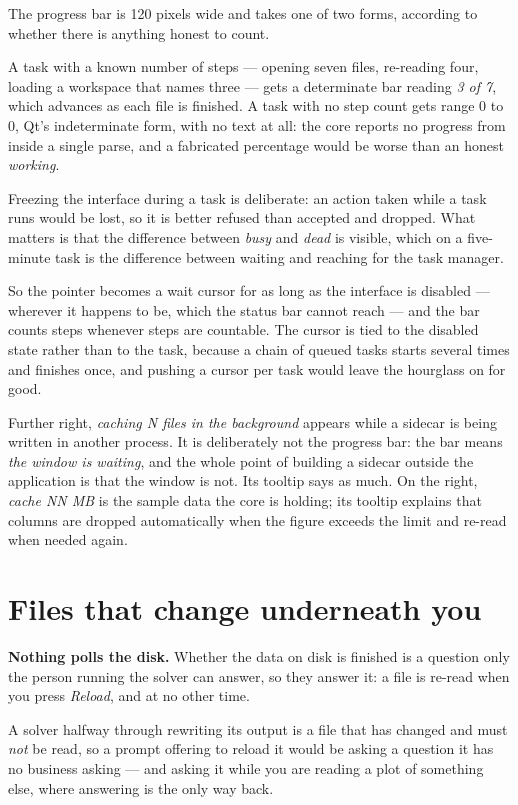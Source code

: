 \documentclass[11pt,a4paper,oneside]{report}
\begin{document}
The progress bar is 120 pixels wide and takes one of two forms, according to
whether there is anything honest to count.

A task with a known number of steps --- opening seven files, re-reading four,
loading a workspace that names three --- gets a determinate bar reading
\emph{3 of 7}, which advances as each file is finished. A task with no step
count gets range 0 to 0, Qt's indeterminate form, with no text at all: the core
reports no progress from inside a single parse, and a fabricated percentage
would be worse than an honest \emph{working}.

Freezing the interface during a task is deliberate: an action taken while a
task runs would be lost, so it is better refused than accepted and dropped.
What matters is that the difference between \emph{busy} and \emph{dead} is
visible, which on a five-minute task is the difference between waiting and
reaching for the task manager.

So the pointer becomes a wait cursor for as long as the interface is disabled
--- wherever it happens to be, which the status bar cannot reach --- and the bar
counts steps whenever steps are countable. The cursor is tied to the disabled
state rather than to the task, because a chain of queued tasks starts several
times and finishes once, and pushing a cursor per task would leave the hourglass
on for good.

Further right, \emph{caching N files in the background} appears while a sidecar
is being written in another process. It is deliberately not the progress bar:
the bar means \emph{the window is waiting}, and the whole point of building a
sidecar outside the application is that the window is not. Its tooltip says as
much. On the right, \emph{cache NN MB} is the sample data the core is holding;
its tooltip explains that columns are dropped automatically when the figure
exceeds the limit and re-read when needed again.

\section{Files that change underneath you}
\label{sec:reload}

\textbf{Nothing polls the disk.} Whether the data on disk is finished is a
question only the person running the solver can answer, so they answer it: a
file is re-read when you press \emph{Reload}, and at no other time.

A solver halfway through rewriting its output is a file that has changed and
must \emph{not} be read, so a prompt offering to reload it would be asking a
question it has no business asking --- and asking it while you are reading a
plot of something else, where answering is the only way back.
\end{document}
